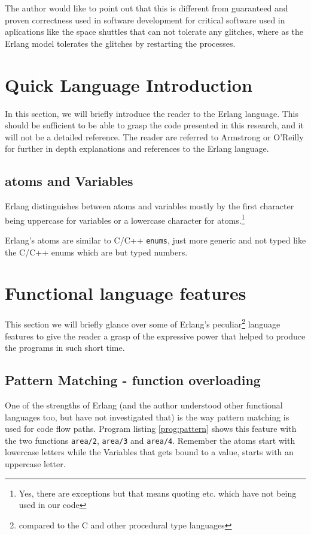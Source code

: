 \documentclass[a4paper,11pt]{report}
\begin{document}
The author would like to point out that this is different from
guaranteed and proven correctness used in software development for
critical software used in aplications like the space shuttles that
can not tolerate any glitches, where as the Erlang model tolerates the
glitches by restarting the processes.

\section{Quick Language Introduction}

In this section, we will briefly introduce the reader to the Erlang
language. This should be sufficient to be able to grasp the code
presented in this research, and  it will not be a detailed
reference. The reader are referred to Armstrong\cite{Armstrong} or
O'Reilly\cite{O'reilly} for further in depth explanations and
references to the Erlang language.

\subsection{atoms and Variables}

Erlang distinguishes between atoms and variables mostly by the first
character being uppercase for variables or a lowercase character for
atoms.\footnote{Yes, there are exceptions but that means quoting
  etc. which have not being used in our code}

Erlang's atoms are similar to C/C++ \texttt{enums}, just more generic
and not typed like the C/C++ enums which are but typed numbers.


\section{Functional language features}

This section we will briefly glance over some of Erlang's
peculiar\footnote{compared to the C and other procedural type
  languages} language features to give the reader a grasp of the
expressive power that helped to produce the programs in such short
time.

\subsection{Pattern Matching - function overloading}
\label{sec:pattern}

One of the strengths of Erlang (and the author understood other
functional languages too, but have not investigated that) is the way
pattern matching is used for code flow paths. Program listing
\ref{prog:pattern} shows this feature with the two functions
\texttt{area/2}, \texttt{area/3} and \texttt{area/4}. Remember the
atoms start with lowercase letters while the Variables that gets bound
to a value, starts with an uppercase letter.
\end{document}
